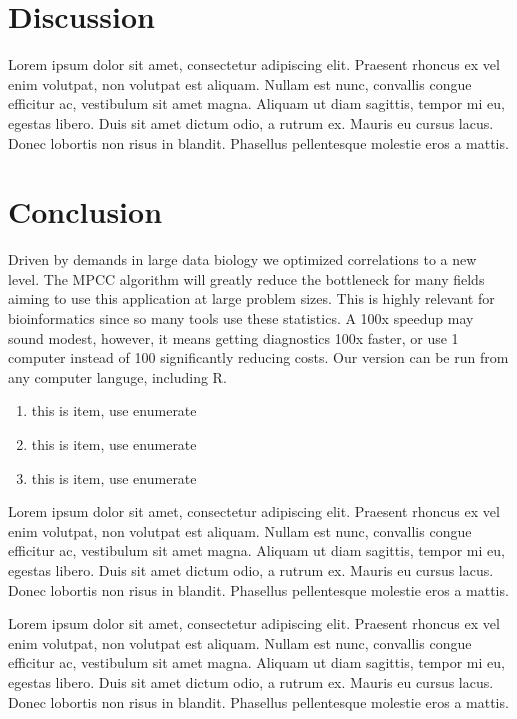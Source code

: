 \documentclass{bioinfo}
\begin{document}
\section{Discussion}

Lorem ipsum dolor sit amet, consectetur adipiscing elit. Praesent 
rhoncus ex vel enim volutpat, non volutpat est aliquam. Nullam est 
nunc, convallis congue efficitur ac, vestibulum sit amet magna. 
Aliquam ut diam sagittis, tempor mi eu, egestas libero. Duis sit 
amet dictum odio, a rutrum ex. Mauris eu cursus lacus. Donec 
lobortis non risus in blandit. Phasellus pellentesque molestie 
eros a mattis. 

\section{Conclusion}

Driven by demands in large data biology we optimized correlations to a new level. 
The MPCC algorithm will greatly reduce the bottleneck for many fields aiming to 
use this application at large problem sizes. This is highly relevant for 
bioinformatics since so many tools use these statistics. A 100x speedup may sound
modest, however, it means getting diagnostics 100x faster, or use 1 computer 
instead of 100 significantly reducing costs. Our version can be run from any 
computer languge, including R.

\begin{enumerate}
\item this is item, use enumerate
\item this is item, use enumerate
\item this is item, use enumerate
\end{enumerate}

Lorem ipsum dolor sit amet, consectetur adipiscing elit. Praesent 
rhoncus ex vel enim volutpat, non volutpat est aliquam. Nullam est 
nunc, convallis congue efficitur ac, vestibulum sit amet magna. 
Aliquam ut diam sagittis, tempor mi eu, egestas libero. Duis sit 
amet dictum odio, a rutrum ex. Mauris eu cursus lacus. Donec 
lobortis non risus in blandit. Phasellus pellentesque molestie 
eros a mattis. 


Lorem ipsum dolor sit amet, consectetur adipiscing elit. Praesent 
rhoncus ex vel enim volutpat, non volutpat est aliquam. Nullam est 
nunc, convallis congue efficitur ac, vestibulum sit amet magna. 
Aliquam ut diam sagittis, tempor mi eu, egestas libero. Duis sit 
amet dictum odio, a rutrum ex. Mauris eu cursus lacus. Donec 
lobortis non risus in blandit. Phasellus pellentesque molestie 
eros a mattis. 
\end{document}
